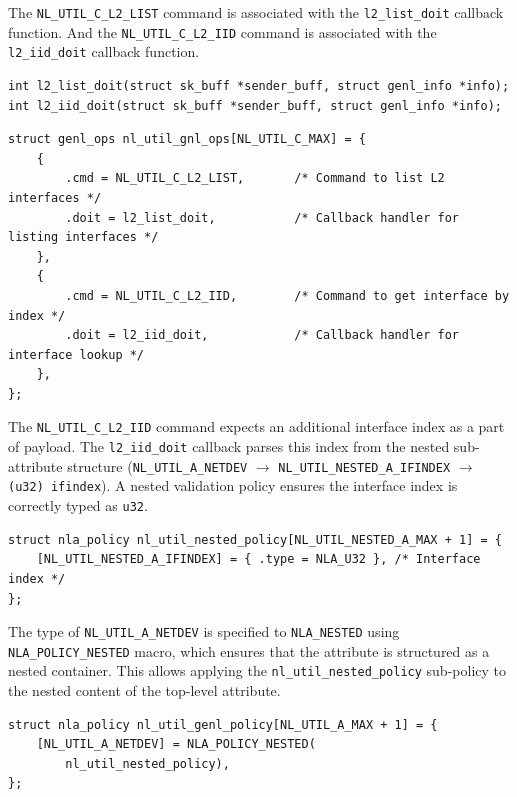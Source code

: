 \documentclass[10pt, letterpaper]{article}
\begin{document}
The \texttt{NL\_UTIL\_C\_L2\_LIST} command is associated with the \texttt{l2\_list\_doit}
callback function. And the \texttt{NL\_UTIL\_C\_L2\_IID} command is associated with the
\texttt{l2\_iid\_doit} callback function.

\begin{lstlisting}[caption={Callback function signatures}]
int l2_list_doit(struct sk_buff *sender_buff, struct genl_info *info);
int l2_iid_doit(struct sk_buff *sender_buff, struct genl_info *info);
\end{lstlisting}

\begin{lstlisting}[caption={Operations}]
struct genl_ops nl_util_gnl_ops[NL_UTIL_C_MAX] = {
    {
        .cmd = NL_UTIL_C_L2_LIST,       /* Command to list L2 interfaces */
        .doit = l2_list_doit,           /* Callback handler for listing interfaces */
    },
    {
        .cmd = NL_UTIL_C_L2_IID,        /* Command to get interface by index */
        .doit = l2_iid_doit,            /* Callback handler for interface lookup */
    },
};
\end{lstlisting}

The \texttt{NL\_UTIL\_C\_L2\_IID} command expects an additional interface index as a part
of payload. The \texttt{l2\_iid\_doit} callback parses this index from the nested
sub-attribute structure (\texttt{NL\_UTIL\_A\_NETDEV} $\rightarrow$
\texttt{NL\_UTIL\_NESTED\_A\_IFINDEX} $\rightarrow$ \texttt{(u32) ifindex}). A nested
validation policy ensures the interface index is correctly typed as \texttt{u32}.

\begin{lstlisting}[caption={Nested validation policy}]
struct nla_policy nl_util_nested_policy[NL_UTIL_NESTED_A_MAX + 1] = {
	[NL_UTIL_NESTED_A_IFINDEX] = { .type = NLA_U32 }, /* Interface index */
};
\end{lstlisting}

The type of \texttt{NL\_UTIL\_A\_NETDEV} is specified to \texttt{NLA\_NESTED} using
\texttt{NLA\_POLICY\_NESTED} macro, which ensures that the attribute is structured as a
nested container. This allows applying the \texttt{nl\_util\_nested\_policy} sub-policy to
the nested content of the top-level attribute.

\begin{lstlisting}[caption={Top-level validation policy}]
struct nla_policy nl_util_genl_policy[NL_UTIL_A_MAX + 1] = {
	[NL_UTIL_A_NETDEV] = NLA_POLICY_NESTED(
		nl_util_nested_policy), 
};
\end{lstlisting}
\end{document}

